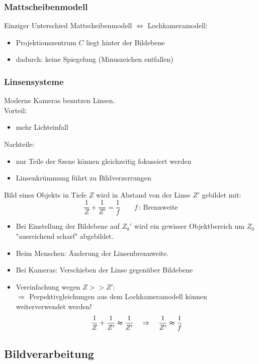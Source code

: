 \subsubsection*{Mattscheibenmodell}

Einziger Unterschied Mattscheibenmodell $\Leftrightarrow$ Lochkameramodell:
\begin{itemize}
\item Projektionszentrum $C$ liegt hinter der Bildebene
\item dadurch: keine Spiegelung (Minuszeichen entfallen)
\end{itemize}

\subsubsection*{Linsensysteme}

Moderne Kameras benutzen Linsen. \\ Vorteil:
\begin{itemize}
\item mehr Lichteinfall
\end{itemize}
Nachteile:
\begin{itemize}
\item nur Teile der Szene können gleichzeitig fokussiert werden
\item Linsenkrümmung führt zu Bildverzerrungen
\end{itemize}
Bild eines Objekts in Tiefe $Z$ wird in Abstand von der Linse $Z'$ gebildet mit: $$\frac{1}{Z} + \frac{1}{Z'} = \frac{1}{f} \qquad f \, : \, \textrm{Brennweite}$$
\begin{itemize}
\item Bei Einstellung der Bildebene auf $Z_0'$ wird ein gewisser Objektbereich um $Z_0$ "{}ausreichend scharf"{} abgebildet.
\item Beim Menschen: Änderung der Linsenbrennweite.
\item Bei Kameras: Verschieben der Linse gegenüber Bildebene
\item Vereinfachung wegen $Z >> Z'$: \\ $\Rightarrow$ Perpektivgleichungen aus dem Lochkameramodell können weiterverwendet werden! $$\frac{1}{Z} + \frac{1}{Z'} \thickapprox \frac{1}{Z'} \quad \Rightarrow \quad \frac{1}{Z'} \thickapprox \frac{1}{f}$$
\end{itemize}

\subsection{Bildverarbeitung}

